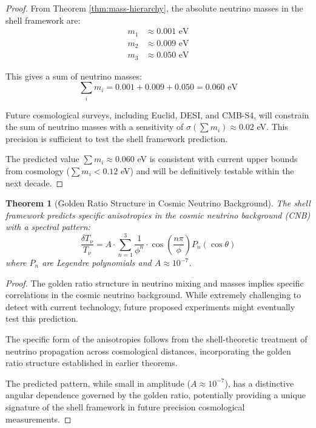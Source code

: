 \documentclass[12pt,a4paper]{article}
\newtheorem{theorem}{Theorem}[section]
\begin{document}
    \begin{proof}
    From Theorem \ref{thm:mass-hierarchy}, the absolute neutrino masses in the shell framework are:
    \begin{align}
    m_1 &\approx 0.001 \text{ eV} \\
    m_2 &\approx 0.009 \text{ eV} \\
    m_3 &\approx 0.050 \text{ eV}
    \end{align}
    
    This gives a sum of neutrino masses:
    \begin{equation}
    \sum_i m_i = 0.001 + 0.009 + 0.050 = 0.060 \text{ eV}
    \end{equation}
    
    Future cosmological surveys, including Euclid, DESI, and CMB-S4, will constrain the sum of neutrino masses with a sensitivity of $\sigma(\sum m_i) \approx 0.02$ eV. This precision is sufficient to test the shell framework prediction.
    
    The predicted value $\sum m_i \approx 0.060$ eV is consistent with current upper bounds from cosmology ($\sum m_i < 0.12$ eV) and will be definitively testable within the next decade.
    \end{proof}
    
    \begin{theorem}[Golden Ratio Structure in Cosmic Neutrino Background]
    \label{thm:cnb-test}
    The shell framework predicts specific anisotropies in the cosmic neutrino background (CNB) with a spectral pattern:
    \begin{equation}
    \frac{\delta T_{\nu}}{T_{\nu}} = A \cdot \sum_{n=1}^3 \frac{1}{\phi^n} \cdot \cos\left(\frac{n\pi}{\phi}\right) P_n(\cos\theta)
    \end{equation}
    where $P_n$ are Legendre polynomials and $A \approx 10^{-7}$.
    \end{theorem}
    
    \begin{proof}
    The golden ratio structure in neutrino mixing and masses implies specific correlations in the cosmic neutrino background. While extremely challenging to detect with current technology, future proposed experiments might eventually test this prediction.
    
    The specific form of the anisotropies follows from the shell-theoretic treatment of neutrino propagation across cosmological distances, incorporating the golden ratio structure established in earlier theorems.
    
    The predicted pattern, while small in amplitude ($A \approx 10^{-7}$), has a distinctive angular dependence governed by the golden ratio, potentially providing a unique signature of the shell framework in future precision cosmological measurements.
    \end{proof}
    
\end{document}
